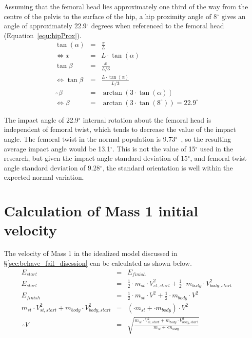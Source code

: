 Assuming that the femoral head lies approximately one third of the way from the centre of the pelvis to the surface of the hip, a hip proximity angle of 8$^\circ$ gives an angle of approximately 22.9$^\circ$ degrees when referenced to the femoral head (Equation~\ref{equ:hipProx}).
\vspace{-1EX}
\begin{eqnarray}
\tan(\alpha) &=& \frac{x}{L}  \nonumber \\
\Leftrightarrow x &=& L \cdot \tan(\alpha)\nonumber \\
\tan{\beta} &=& \frac{x}{L/3}\nonumber \\
\Leftrightarrow \tan{\beta} &=& \frac{L \cdot \tan(\alpha) }{L/3}\nonumber \\
\therefore \beta &=& \arctan(3 \cdot \tan(\alpha))\nonumber \\
\Leftrightarrow \beta &=& \arctan(3 \cdot \tan(8^\circ)) = 22.9^\circ
\label{equ:hipProx}
\end{eqnarray}

The impact angle of 22.9$^\circ$ internal rotation about the femoral head is independent of femoral twist, which tends to decrease the value of the impact angle.
The femoral twist in the normal population is 9.73$^\circ$~\citep{toogood_proximal_2009}, so the resulting average impact angle would be 13.1$^\circ$.
This is not the value of 15$^\circ$ used in the research, but given the impact angle standard deviation of 15$^\circ$, and femoral twist angle standard deviation of 9.28$^\circ$, the standard orientation is well within the expected normal variation.

\section{Calculation of Mass 1 initial velocity}
\label{sec:support_mass1_velocity}
The velocity of Mass 1 in the idealized model discussed in \S\ref{sec:behave_fail_discssion} can be calculated as shown below.
\vspace{-1EX}
\begin{eqnarray}
E_{start} &=& E_{finish}\nonumber \\
E_{start} &=& \frac{1}{2} \cdot m_{st} \cdot V_{st,start}^2 + \frac{1}{2} \cdot m_{body} \cdot V_{body,start}^2\nonumber\\
E_{finish} &=& \frac{1}{2} \cdot m_{st} \cdot V^2 + \frac{1}{2} \cdot m_{body} \cdot V^2\nonumber\\
m_{st} \cdot V_{st,start}^2 + m_{body} \cdot V_{body,start}^2 &=& \left(\cdot m_{st} + \cdot m_{body}\right) \cdot V^2\nonumber\\
\therefore V &=& \sqrt{ \frac{m_{st} \cdot V_{st,start}^2 + m_{body} \cdot V_{body,start}^2}{m_{st} + \cdot m_{body}} }
\end{eqnarray}

